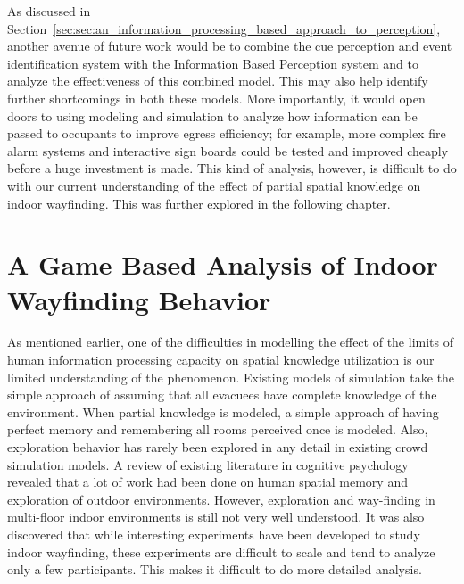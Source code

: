 As discussed in Section~\ref{sec:sec:an_information_processing_based_approach_to_perception}, another avenue of future work would be to combine the cue perception and event identification system with the Information Based Perception system and to analyze the effectiveness of this combined model. This may also help identify further shortcomings in both these models. More importantly, it would open doors to using modeling and simulation to analyze how information can be passed to occupants to improve egress efficiency; for example, more complex fire alarm systems and interactive sign boards could be tested and improved cheaply before a huge investment is made. This kind of analysis, however, is difficult to do with our current understanding of the effect of partial spatial knowledge on indoor wayfinding. This was further explored in the following chapter.




\section{A Game Based Analysis of Indoor Wayfinding Behavior} %
\label{sec:a_game_based_analysis_of_indoor_wayfinding_behavior}

As mentioned earlier, one of the difficulties in modelling the effect of the limits of human information processing capacity on spatial knowledge utilization is our limited understanding of the phenomenon.
Existing models of simulation take the simple approach of assuming that all evacuees have complete knowledge of the environment. When partial knowledge is modeled, a simple approach of having perfect memory and remembering all rooms perceived once is modeled. Also, exploration behavior has rarely been explored in any detail in existing crowd simulation models. A review of existing literature in cognitive psychology revealed that a lot of work had been done on human spatial memory and exploration of outdoor environments. However, exploration and way-finding in multi-floor indoor environments is still not very well understood. It was also discovered that while interesting experiments have been developed to study indoor wayfinding, these experiments are difficult to scale and tend to analyze only a few participants. This makes it difficult to do more detailed analysis.

